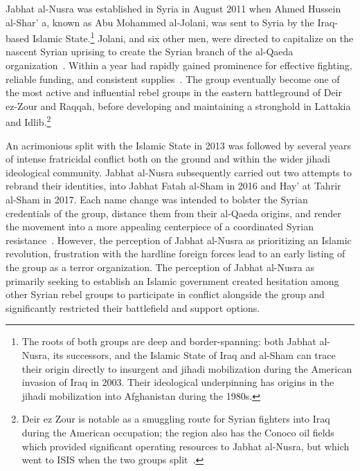 Jabhat al-Nusra was established in Syria in August 2011 when Ahmed Hussein al-Shar' a, known as Abu Mohammed al-Jolani, was sent to Syria by the Iraq-based Islamic State.\footnote{The roots of both groups are deep and border-spanning:  both Jabhat al-Nusra, its successors, and the Islamic State of Iraq and al-Sham can trace their origin directly to insurgent and jihadi mobilization during the American invasion of Iraq in 2003. Their ideological underpinning has origins in the jihadi mobilization into Afghanistan during the 1980s.} Jolani, and six other men, were directed to capitalize on the nascent Syrian uprising to create the Syrian branch of the al-Qaeda organization~\autocite{abouzeid2014nextdoor}.  Within a year had rapidly gained prominence for effective fighting, reliable funding, and consistent supplies~\autocite{bbc2016jfs, ahad2013nusra}. The group eventually become one of the most active and influential rebel groups in the eastern battleground of Deir ez-Zour and Raqqah, before developing and maintaining a stronghold in Lattakia and Idlib.\footnote{Deir ez Zour is notable as a smuggling route for Syrian fighters into Iraq during the American occupation; the region also has the Conoco oil fields which provided significant operating resources to Jabhat al-Nusra, but which went to ISIS when the two groups split~\autocite{bauer2019behind}.}

An acrimonious split with the Islamic State in 2013 was followed by several years of intense fratricidal conflict both on the ground and within the wider jihadi ideological community. Jabhat al-Nusra subsequently carried out two attempts to rebrand their identities, into Jabhat Fatah al-Sham in 2016 and Hay' at Tahrir al-Sham in 2017.  Each name change was intended to bolster the Syrian credentials of the group, distance them from their al-Qaeda origins, and render the movement into a more appealing centerpiece of a coordinated Syrian resistance~\autocite{bbc2016jfs}.  However, the perception of Jabhat al-Nusra as prioritizing an Islamic revolution,  frustration with the hardline foreign forces lead to an early listing of the group as a terror organization. The perception of Jabhat al-Nusra as primarily seeking to establish an Islamic government created hesitation among other Syrian rebel groups to participate in conflict alongside the group and significantly restricted their battlefield and support options.

